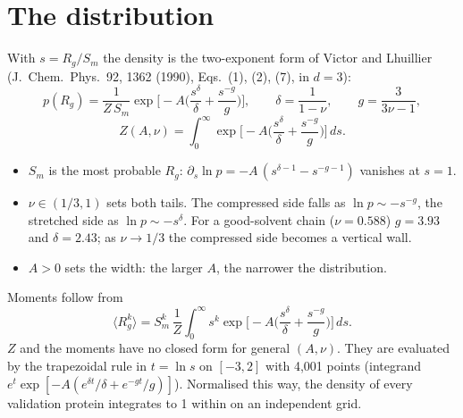 \documentclass[11pt]{article}
\newcommand{\Rg}{R_g}
\begin{document}
\section{The distribution}
With $s=\Rg/S_m$ the density is the two-exponent form of Victor and Lhuillier (J.\ Chem.\ Phys.\ 92, 1362 (1990),
Eqs.~(1), (2), (7), in $d=3$):
\begin{equation}\label{eq:p}
p(\Rg)=\frac{1}{Z\,S_m}\exp\!\Big[-A\Big(\frac{s^{\delta}}{\delta}+\frac{s^{-g}}{g}\Big)\Big],\qquad
\delta=\frac{1}{1-\nu},\qquad g=\frac{3}{3\nu-1},
\end{equation}
\begin{equation}\label{eq:Z}
Z(A,\nu)=\int_0^\infty \exp\!\Big[-A\Big(\frac{s^{\delta}}{\delta}+\frac{s^{-g}}{g}\Big)\Big]\,ds .
\end{equation}
\begin{itemize}
\item $S_m$ is the most probable $\Rg$: $\partial_s\ln p=-A\,(s^{\delta-1}-s^{-g-1})$ vanishes at $s=1$.
\item $\nu\in(1/3,1)$ sets both tails. The compressed side falls as $\ln p\sim-s^{-g}$, the stretched side as
  $\ln p\sim-s^{\delta}$. For a good-solvent chain ($\nu=0.588$) $g=3.93$ and $\delta=2.43$; as $\nu\to1/3$ the
  compressed side becomes a vertical wall.
\item $A>0$ sets the width: the larger $A$, the narrower the distribution.
\end{itemize}
Moments follow from
\begin{equation}
\langle\Rg^k\rangle=S_m^k\,\frac{1}{Z}\int_0^\infty s^k\exp\!\Big[-A\Big(\frac{s^{\delta}}{\delta}+\frac{s^{-g}}{g}\Big)\Big]\,ds .
\end{equation}
$Z$ and the moments have no closed form for general $(A,\nu)$. They are evaluated by the trapezoidal rule in
$t=\ln s$ on $[-3,2]$ with 4{,}001 points (integrand $e^{t}\exp[-A(e^{\delta t}/\delta+e^{-gt}/g)]$). Normalised
this way, the density of every validation protein integrates to 1 within  on an independent
grid.

\end{document}
